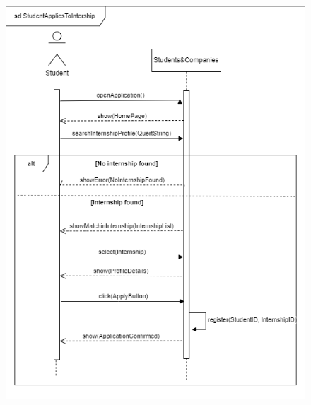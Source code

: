 \documentclass[a4paper,12pt]{article}
\begin{document}
\begin{figure}[H]
    \centering
    \includegraphics[scale = 0.45]{figures/UseCasesSD/StudentAppliesToIntershipSD.drawio (1).png}
\end{figure}
\end{document}
